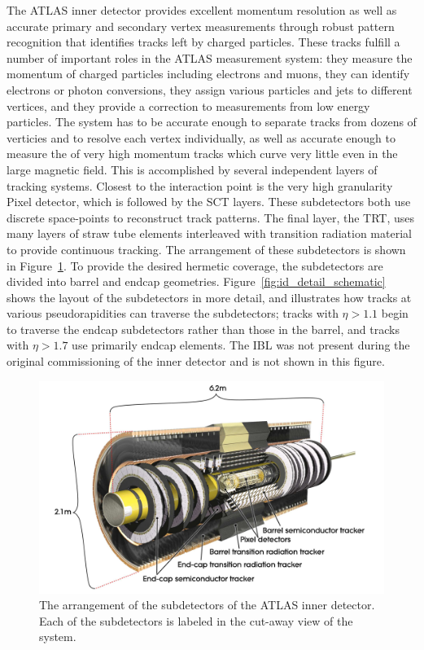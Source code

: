 The \ac{ATLAS} inner detector provides excellent momentum resolution as well as accurate primary and secondary vertex measurements through robust pattern recognition that identifies tracks left by charged particles. 
These tracks fulfill a number of important roles in the \ac{ATLAS} measurement system: they measure the momentum of charged particles including electrons and muons, they can identify electrons or photon conversions, they assign various particles and jets to different vertices, and they provide a correction to \met measurements from low energy particles. 
The system has to be accurate enough to separate tracks from dozens of verticies and to resolve each vertex individually, as well as accurate enough to measure the \pt of very high momentum tracks which curve very little even in the large magnetic field.
This is accomplished by several independent layers of tracking systems.
Closest to the interaction point is the very high granularity Pixel detector, which is followed by the \ac{SCT} layers.
These subdetectors both use discrete space-points to reconstruct track patterns.
The final layer, the \ac{TRT}, uses many layers of straw tube elements interleaved with transition radiation material to provide continuous tracking.
The arrangement of these subdetectors is shown in Figure~\ref{fig:id_overview}.
To provide the desired hermetic coverage, the subdetectors are divided into barrel and endcap geometries.
Figure~\ref{fig:id_detail_schematic} shows the layout of the subdetectors in more detail, and illustrates how tracks at various pseudorapidities can traverse the subdetectors; tracks with $\eta > 1.1$ begin to traverse the endcap subdetectors rather than those in the barrel, and tracks with $\eta > 1.7$ use primarily endcap elements. 
The \ac{IBL} was not present during the original commissioning of the inner detector and is not shown in this figure.

\begin{figure}[hbtp]
\includegraphics[width=\fullfig]{figures/id_overview.pdf}
\caption{The arrangement of the subdetectors of the \ac{ATLAS} inner detector. Each of the subdetectors is labeled in the cut-away view of the system.}
\label{fig:id_overview}
\end{figure}

